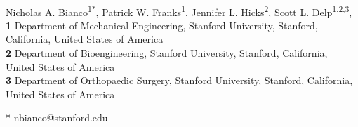 \documentclass[10pt,letterpaper]{article}
\providecommand{\DIFaddbegin}{} %
\providecommand{\DIFaddend}{} %
\newcommand{\DIFaddincludegraphics}[2][]{{\color{blue}\fbox{\DIFOincludegraphics[#1]{#2}}}} %
\DeclareRobustCommand{\DIFaddbegin}{\DIFOaddbegin \let\includegraphics\DIFaddincludegraphics} %
\DeclareRobustCommand{\DIFaddend}{\DIFOaddend \let\includegraphics\DIFOincludegraphics} %
\begin{document}
\DIFaddbegin 

\DIFaddend \vspace*{0.2in}

\begin{flushleft}
{\Large
\textbf{} %
}
\newline
\\
Nicholas A. Bianco\textsuperscript{1*},
Patrick W. Franks\textsuperscript{1},
Jennifer L. Hicks\textsuperscript{2},
Scott L. Delp\textsuperscript{1,2,3},
\\
\bigskip
\textbf{1} Department of Mechanical Engineering, Stanford University, Stanford, California, United States of America
\\
\textbf{2} Department of Bioengineering, Stanford University, Stanford, California, United States of America
\\
\textbf{3} Department of Orthopaedic Surgery, Stanford University, Stanford, California, United States of America
\\
\bigskip


* nbianco@stanford.edu

\end{flushleft}
\end{document}
